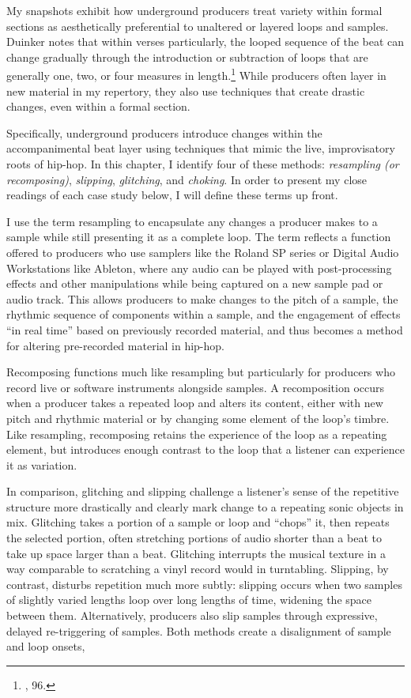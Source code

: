 My snapshots exhibit how underground producers treat variety within formal sections as aesthetically preferential to unaltered or layered loops and samples. Duinker notes that within verses particularly, the looped sequence of the beat can change gradually through the introduction or subtraction of loops that are generally one, two, or four measures in length.\footnote{\cite{benduinkerSongFormMainstreaming2020}, 96.} While producers often layer in new material in my repertory, they also use techniques that create drastic changes, even within a formal section. 

Specifically, underground producers introduce changes within the accompanimental beat layer using techniques that mimic the live, improvisatory roots of hip-hop. In this chapter, I identify four of these methods: \emph{resampling (or recomposing)}, \emph{slipping}, \emph{glitching}, and \emph{choking}. In order to present my close readings of each case study below, I will define these terms up front.

I use the term resampling to encapsulate any changes a producer makes to a sample while still presenting it as a complete loop. The term reflects a function offered to producers who use samplers like the Roland SP series or Digital Audio Workstations like Ableton, where any audio can be played with post-processing effects and other manipulations while being captured on a new sample pad or audio track. This allows producers to make changes to the pitch of a sample, the rhythmic sequence of components within a sample, and the engagement of effects ``in real time'' based on previously recorded material, and thus becomes a method for altering pre-recorded material in hip-hop.

Recomposing functions much like resampling but particularly for producers who record live or software instruments alongside samples. A recomposition occurs when a producer takes a repeated loop and alters its content, either with new pitch and rhythmic material or by changing some element of the loop's timbre. Like resampling, recomposing retains the experience of the loop as a repeating element, but introduces enough contrast to the loop that a listener can experience it as variation.

In comparison, glitching and slipping challenge a listener's sense of the repetitive structure more drastically and clearly mark change to a repeating sonic objects in mix. Glitching takes a portion of a sample or loop and ``chops'' it, then repeats the selected portion, often stretching portions of audio shorter than a beat to take up space larger than a beat. Glitching interrupts the musical texture in a way comparable to scratching a vinyl record would in turntabling. Slipping, by contrast, disturbs repetition much more subtly: slipping occurs when two samples of slightly varied lengths loop over long lengths of time, widening the space between them. Alternatively, producers also slip samples through expressive, delayed re-triggering of samples. Both methods create a disalignment of sample and loop onsets, 



